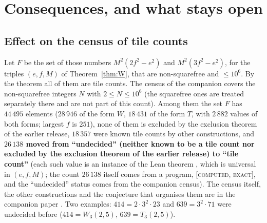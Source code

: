 \documentclass[11pt,reqno]{amsart}
\theoremstyle{plain}
\theoremstyle{definition}
\newcommand{\lab}[1]{\textup{[\textsc{#1}]}}
\newcommand{\CE}{\lab{computed, exact}}
\begin{document}
\section{Consequences, and what stays open}\label{sec:open}
\subsection{Effect on the census of tile counts}
Let $F$ be the set of those numbers $M^2(2f^2-e^2)$ and $M^2(3f^2-e^2)$, for the triples $(e,f,M)$ of Theorem~\ref{thm:W}, that are non-squarefree and $\le10^6$. By the theorem all of them are tile counts. The census of the companion covers the non-squarefree integers $N$ with $2\le N\le10^6$ (the squarefree ones are treated separately there and are not part of this count). Among them the set $F$ has $44\,495$ elements ($28\,946$ of the form $W$, $18\,431$ of the form $T$, with $2\,882$ values of both forms; largest $f$ is $251$), none of them is excluded by the exclusion theorem of the earlier release, $18\,357$ were known tile counts by other constructions, and \textbf{$26\,138$ moved from ``undecided'' (neither known to be a tile count nor excluded by the exclusion theorem of the earlier release) to ``tile count''} (each such value is an instance of the Lean theorem , which is universal in $(e,f,M)$; the count $26\,138$ itself comes from a program, \CE{}, and the ``undecided'' status comes from the companion census). The census itself, the other constructions and the conjecture that organises them are in the companion paper \cite{Companion}.
Two examples: $414=2\cdot 3^2\cdot 23$ and $639=3^2\cdot71$ were undecided before ($414=W_3(2,5)$, $639=T_3(2,5)$).
\end{document}
